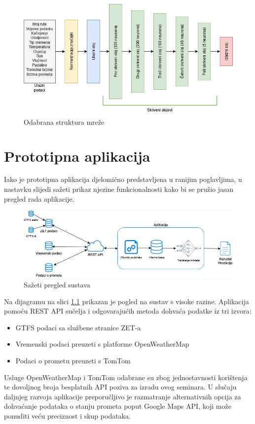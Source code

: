 \documentclass[seminarskirad]{fer}
\begin{document}
\begin{figure}[htb]
	\centering
	\includegraphics[width=0.75\linewidth]{Figures/mreza.png} 
	\caption{Odabrana struktura mreže}
	\label{slk:mreza}
\end{figure}

\chapter{Prototipna aplikacija}
\label{pog:prototip}

Iako je prototipna aplikacija djelomično predstavljena u ranijim poglavljima, u nastavku slijedi sažeti prikaz njezine funkcionalnosti kako bi se pružio jasan pregled rada aplikacije.\\

\begin{figure}[htb]
	\centering
	\includegraphics[width=0.9\linewidth]{Figures/sustav.png} 
	\caption{Sažeti pregled sustava}
	\label{slk:sustav}
\end{figure}

Na dijagramu na slici \ref{slk:sustav} prikazan je pogled na sustav s visoke razine. Aplikacija pomoću REST API sučelja i odgovarajućih metoda dohvaća podatke iz tri izvora:
\begin{itemize}
	\item GTFS podaci sa službene stranice ZET-a
	\item Vremenski podaci preuzeti s platforme OpenWeatherMap
	\item Podaci o prometu preuzeti s TomTom
\end{itemize}
Usluge OpenWeatherMap i TomTom odabrane su zbog jednostavnosti korištenja te dovoljnog broja besplatnih API poziva za izradu ovog seminara. U slučaju daljnjeg razvoja aplikacije preporučljivo je razmatranje alternativnih opcija za dohvaćanje podataka o stanju prometa poput Google Maps API, koji može ponuditi veću preciznost i skup podataka.
\end{document}
